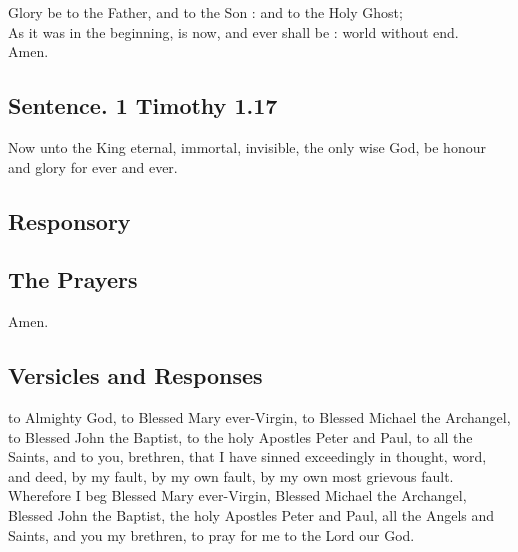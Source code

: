 Glory be to the Father, and to the Son : and to the Holy Ghost;\\
As it was in the beginning, is now, and ever shall be : world without end.\\
Amen.

\subsection{Sentence. 1 Timothy 1.17}

Now unto the King eternal, immortal, invisible, the only wise God, be honour and glory for ever and ever.


\subsection{Responsory}


\subsection{The Prayers}



Amen.

\subsection{Versicles and Responses}


 to Almighty God, to Blessed Mary ever-Virgin, to Blessed Michael
the Archangel, to Blessed John the Baptist, to the holy Apostles Peter and
Paul, to all the Saints, and to you, brethren, that I have sinned exceedingly in
thought, word, and deed, by my fault, by my own fault, by my own most
grievous fault. Wherefore I beg Blessed Mary ever-Virgin, Blessed Michael
the Archangel, Blessed John the Baptist, the holy Apostles Peter and Paul, all
the Angels and Saints, and you my brethren, to pray for me to the Lord our God.

